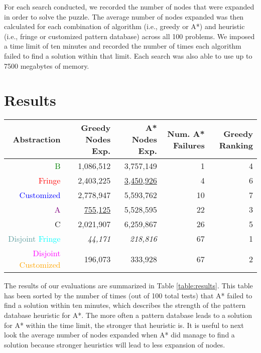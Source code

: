 \documentclass[letterpaper]{article}
\begin{document}
For each search conducted, we recorded the number of nodes that were expanded in order to solve the puzzle.  The average number of nodes expanded was then calculated for each combination of algorithm (i.e., greedy or A*) and heuristic (i.e., fringe or customized pattern database) across all 100 problems.  We imposed a time limit of ten minutes and recorded the number of times each algorithm failed to find a solution within that limit.  Each search was also able to use up to 7500 megabytes of memory.

\section{Results}

\begin{table*}
\centering
\begin{tabular}{ r | r | r | r | r }
      Abstraction  & Greedy Nodes Exp.     & A* Nodes Exp. & Num. A* Failures & Greedy Ranking\\ \hline 
\textcolor{green}{B}                                         &  1,086,512  & 3,757,149 &  1 & 4\\ 
\textcolor{red}{Fringe}                                      &  2,403,225  & \underline{3,450,926} &  4 & 6\\ 
\textcolor{blue}{Customized}                                 &  2,778,947  & 5,593,762 & 10 & 7\\ 
\textcolor{Purple}{A}                                        &    \underline{755,125}  & 5,528,595 & 22 & 3\\ 
\textcolor{RawSienna}{C}                                     &  2,021,907  & 6,259,867 & 26 & 5\\ 
\textcolor{CadetBlue}{Disjoint} \textcolor{cyan}{Fringe}           &     \textit{44,171}  &   \textit{218,816} & 67 & 1\\ 
\textcolor{magenta}{Disjoint} \textcolor{orange}{Customized} &    196,073  &   333,928 & 67 & 2\\ 
\end{tabular}
\caption{average number of nodes expanded, sorted by the number of times A* failed to find a solution.}
\label{table:results}
\end{table*}

The results of our evaluations are summarized in Table \ref{table:results}.  This table has been sorted by the number of times (out of 100 total tests) that A* failed to find a solution within ten minutes, which describes the strength of the pattern database heuristic for A*.  The more often a pattern database leads to a solution for A* within the time limit, the stronger that heuristic is.  It is useful to next look the average number of nodes expanded when A* did manage to find a solution because stronger heuristics will lead to less expansion of nodes.
\end{document}
